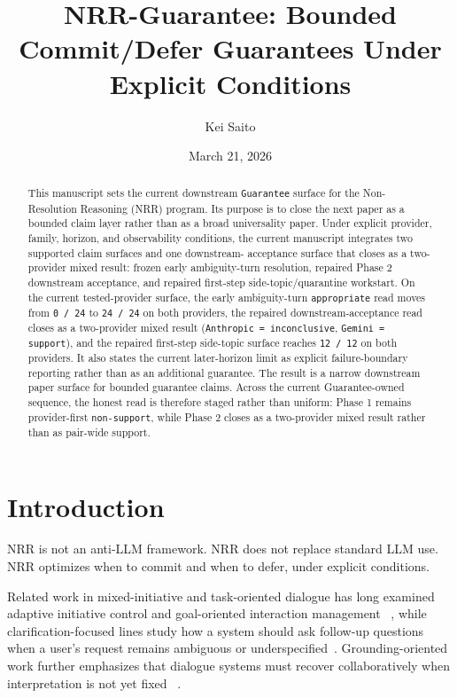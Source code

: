 \documentclass[11pt]{article}
\title{NRR-Guarantee: Bounded Commit/Defer Guarantees Under Explicit Conditions}
\author{Kei Saito}
\date{March 21, 2026}
\begin{document}
\maketitle

\begin{abstract}
This manuscript sets the current downstream \texttt{Guarantee} surface for the
Non-Resolution Reasoning (NRR) program. Its purpose is to close the next paper
as a bounded claim layer rather than as a broad universality paper. Under
explicit provider, family, horizon, and observability conditions, the current
manuscript integrates two supported claim surfaces and one downstream-
acceptance surface that closes as a two-provider mixed result: frozen early
ambiguity-turn resolution, repaired Phase 2 downstream acceptance, and repaired
first-step side-topic/quarantine workstart. On the current tested-provider
surface, the early ambiguity-turn \texttt{appropriate} read moves from
\texttt{0 / 24} to \texttt{24 / 24} on both providers, the repaired
downstream-acceptance read closes as a two-provider mixed result
(\texttt{Anthropic = inconclusive}, \texttt{Gemini = support}), and the
repaired first-step side-topic surface reaches \texttt{12 / 12} on both
providers. It also states the current later-horizon limit as explicit
failure-boundary reporting rather than as an additional guarantee. The result
is a narrow downstream paper surface for bounded guarantee claims. Across the
current Guarantee-owned sequence, the honest read is therefore staged rather
than uniform: Phase 1 remains provider-first \texttt{non-support}, while
Phase 2 closes as a two-provider mixed result rather than as pair-wide
support.
\end{abstract}

\section{Introduction}

NRR is not an anti-LLM framework. NRR does not replace standard LLM use. NRR
optimizes when to commit and when to defer, under explicit conditions.

Related work in mixed-initiative and task-oriented dialogue has long examined
adaptive initiative control and goal-oriented interaction management
~\cite{chucarroll2000mimic,saito2017taskdialogue}, while clarification-focused lines
study how a system should ask follow-up questions when a user's request remains
ambiguous or underspecified~\cite{deboni2003clarification,rao2018evpi,hu2020interactive}. Grounding-oriented work further emphasizes that dialogue systems
must recover collaboratively when interpretation is not yet fixed
~\cite{benotti2021groundedclarifications,benotti2021grounding}.
\end{document}
